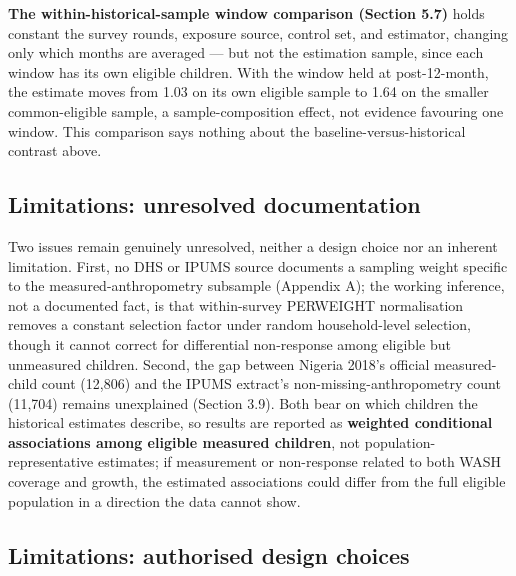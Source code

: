 \textbf{The within-historical-sample window comparison (Section 5.7)} holds constant the survey rounds, exposure source, control set, and estimator, changing only which months are averaged --- but not the estimation sample, since each window has its own eligible children. With the window held at post-12-month, the estimate moves from 1.03 on its own eligible sample to 1.64 on the smaller common-eligible sample, a sample-composition effect, not evidence favouring one window. This comparison says nothing about the baseline-versus-historical contrast above.

\subsection{Limitations: unresolved documentation}\label{sec:6.3}

Two issues remain genuinely unresolved, neither a design choice nor an inherent limitation. First, no DHS or IPUMS source documents a sampling weight specific to the measured-anthropometry subsample (Appendix A); the working inference, not a documented fact, is that within-survey PERWEIGHT normalisation removes a constant selection factor under random household-level selection, though it cannot correct for differential non-response among eligible but unmeasured children. Second, the gap between Nigeria 2018's official measured-child count (12,806) and the IPUMS extract's non-missing-anthropometry count (11,704) remains unexplained (Section 3.9). Both bear on which children the historical estimates describe, so results are reported as \textbf{weighted conditional associations among eligible measured children}, not population-representative estimates; if measurement or non-response related to both WASH coverage and growth, the estimated associations could differ from the full eligible population in a direction the data cannot show.

\subsection{Limitations: authorised design choices}\label{sec:6.4}


